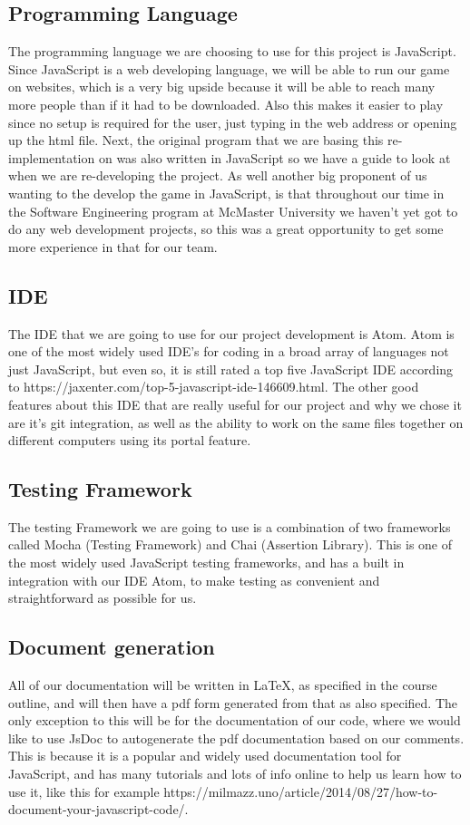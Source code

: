 \documentclass{article}
\begin{document}
\subsection{Programming Language}
The programming language we are choosing to use for this project is JavaScript. Since JavaScript is a web developing language, we will be able to run our game on websites, which is a very big upside because it will be able to reach many more people than if it had to be downloaded. Also this makes it easier to play since no setup is required for the user, just typing in the web address or opening up the html file. Next, the original program that we are basing this re-implementation on was also written in JavaScript so we have a guide to look at when we are re-developing the project. As well another big proponent of us wanting to the develop the game in JavaScript, is that throughout our time in the Software Engineering program at McMaster University we haven’t yet got to do any web development projects, so this was a great opportunity to get some more experience in that for our team.
\subsection{IDE}
The IDE that we are going to use for our project development is Atom. Atom is one of the most widely used IDE’s for coding in a broad array of languages not just JavaScript, but even so, it is still rated a top five JavaScript IDE according to https://jaxenter.com/top-5-javascript-ide-146609.html. The other good features about this IDE that are really useful for our project and why we chose it are it’s git integration, as well as the ability to work on the same files together on different computers using its portal feature.
\subsection{Testing Framework}
The testing Framework we are going to use is a combination of two frameworks called Mocha (Testing Framework) and Chai (Assertion Library). This is one of the most widely used JavaScript testing frameworks, and has a built in integration with our IDE Atom, to make testing as convenient and straightforward as possible for us.
\subsection{Document generation}
All of our documentation will be written in LaTeX, as specified in the course outline, and will then have a pdf form generated from that as also specified. The only exception to this will be for the documentation of our code, where we would like to use JsDoc to autogenerate the pdf documentation based on our comments. This is because it is a popular and widely used documentation tool for JavaScript, and has many tutorials and lots of info online to help us learn how to use it, like this for example https://milmazz.uno/article/2014/08/27/how-to-document-your-javascript-code/.
\end{document}
